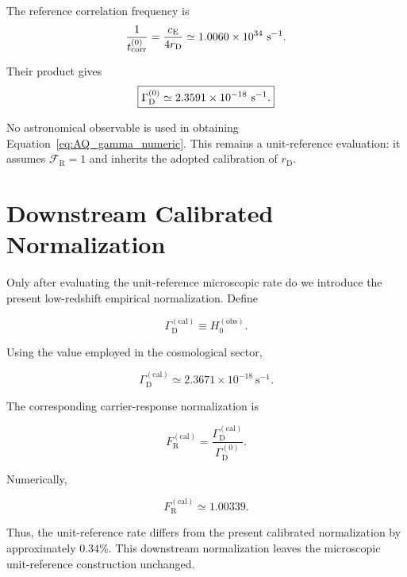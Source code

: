 The reference correlation frequency is
\begin{equation}
    \frac{1}{
        t_{\mathrm{corr}}^{(0)}
    }
    =
    \frac{
        c_{\mathrm E}
    }{
        4r_{\mathrm D}
    }
    \simeq
    1.0060\times10^{34}
    \ {\rm s^{-1}}.
\end{equation}

Their product gives
\begin{equation}
    \boxed{
    \Gamma_{\mathrm D}^{(0)}
    \simeq
    2.3591\times10^{-18}
    \ {\rm s^{-1}}.
    }
    \label{eq:AQ_gamma_numeric}
\end{equation}

No astronomical observable is used in obtaining
Equation~\eqref{eq:AQ_gamma_numeric}. This remains a unit-reference
evaluation: it assumes $\mathcal F_{\mathrm R}=1$ and inherits the adopted
calibration of $r_{\mathrm D}$.


\section{Downstream Calibrated Normalization}

Only after evaluating the unit-reference microscopic rate do we introduce the present low-redshift empirical normalization. Define

\begin{equation}
    \Gamma_{\mathrm D}^{(\mathrm{cal})}
    \equiv
    H_0^{(\mathrm{obs})}.
\end{equation}

Using the value employed in the cosmological sector,

\begin{equation}
    \Gamma_{\mathrm D}^{(\mathrm{cal})}
    \simeq
    2.3671\times10^{-18}\ \mathrm{s}^{-1}.
\end{equation}

The corresponding carrier-response normalization is

\begin{equation}
    F_{\mathrm R}^{(\mathrm{cal})}
    =
    \frac{
        \Gamma_{\mathrm D}^{(\mathrm{cal})}
    }{
        \Gamma_{\mathrm D}^{(0)}
    }.
\end{equation}

Numerically,

\begin{equation}
    F_{\mathrm R}^{(\mathrm{cal})}
    \simeq
    1.00339.
\end{equation}

Thus, the unit-reference rate differs from the present calibrated normalization by approximately $0.34\%$. This downstream normalization leaves the microscopic unit-reference construction unchanged.

